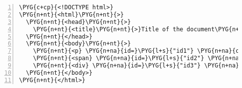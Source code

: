\begin{Verbatim}[commandchars=\\\{\},numbers=left,stepnumber=1,codes={\catcode`\$=3\catcode`\^=7\catcode`\_=8}]
\PYG{c+cp}{<!DOCTYPE html>}
\PYG{n+nt}{<html}\PYG{n+nt}{>}
  \PYG{n+nt}{<head}\PYG{n+nt}{>}
    \PYG{n+nt}{<title}\PYG{n+nt}{>}Title of the document\PYG{n+nt}{</title>}
  \PYG{n+nt}{</head>}
  \PYG{n+nt}{<body}\PYG{n+nt}{>}
    \PYG{n+nt}{<p} \PYG{n+na}{id=}\PYG{l+s}{"id1"} \PYG{n+na}{class=}\PYG{l+s}{"class1 class2"}\PYG{n+nt}{>}Hello world!\PYG{n+nt}{</p>}
    \PYG{n+nt}{<span} \PYG{n+na}{id=}\PYG{l+s}{"id2"} \PYG{n+na}{class=}\PYG{l+s}{"class1 class2"}\PYG{n+nt}{>}...\PYG{n+nt}{</span>}
    \PYG{n+nt}{<div} \PYG{n+na}{id=}\PYG{l+s}{"id3"} \PYG{n+na}{class=}\PYG{l+s}{"class1"}\PYG{n+nt}{>}Good Bye!\PYG{n+nt}{</div>}
  \PYG{n+nt}{</body>}
\PYG{n+nt}{</html>}
\end{Verbatim}
